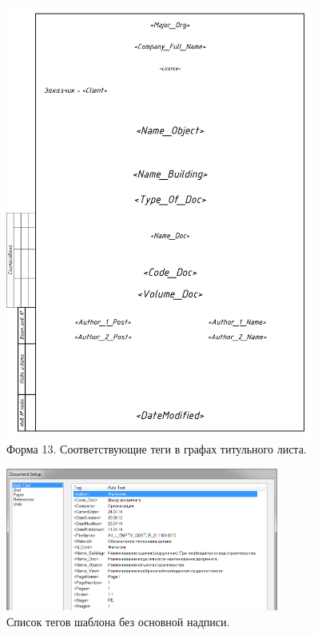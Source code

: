 \documentclass[14pt]{extreport}
\begin{document}
\begin{figure}[h]
	\centering
	\includegraphics[width=0.9\textwidth]{SPDS_TIT_LIST_with_tagname}
    \caption{Форма 13. Соответствующие теги в графах титульного листа.\label{SPDS_TIT_LIST_with_tagname}}
\end{figure}

\begin{figure}[h]
	\centering
	\includegraphics[width=0.8\textwidth]{SPDS_EMPTY}
    \caption{Список тегов шаблона без основной надписи.\label{SPDS_EMPTY}}
\end{figure}
\end{document}
